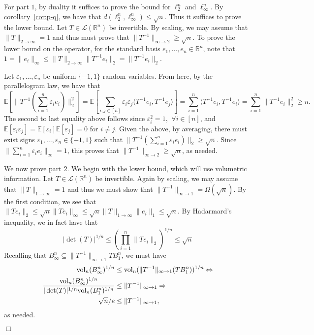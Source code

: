\documentclass[11pt]{article}
\theoremstyle{plain}
\newenvironment{proof}{\noindent {\sc Proof:}}{$\Box$ \medskip}
\theoremstyle{plain}
\newcommand{\set}[1]{\{{#1}\}}
\newcommand{\R}{\ensuremath{\mathbb{R}}}
\newcommand{\E}{\ensuremath{\mathbb{E}}}
\newcommand{\pr}[2]{\langle{#1, #2}\rangle}
\newcommand{\eps}{\varepsilon}
\newcommand{\vol}{{\rm vol}}
\begin{document}
\begin{proof}
For part $1$, by duality it suffices to prove the bound for $\ell_2^n$ and
$\ell_\infty^n$. By corollary~\ref{cor:p-q}, we have that
$d(\ell_2^n,\ell_\infty^n) \leq \sqrt{n}$. Thus it suffices to prove the lower
bound. Let $T \in \mathcal{L}(\R^n)$ be invertible. By
scaling, we may assume that $\|T\|_{2 \rightarrow \infty} = 1$ and thus must
prove that $\|T^{-1}\|_{\infty \rightarrow 2} \geq \sqrt{n}$. To prove the lower
bound on the operator, for the standard basis $e_1,\dots,e_n \in \R^n$, note
that $1 = \|e_i\|_\infty \leq \|T\|_{2 \rightarrow \infty} \|T^{-1} e_i\|_2 =
\|T^{-1} e_i\|_2$.

Let $\eps_1,\dots,\eps_n$ be uniform $\set{-1,1}$ random variables. From here,
by the parallelogram law, we have that
\[
\E[\|T^{-1}(\sum_{i=1}^n \eps_i e_i)\|_2^2] = \E[\sum_{i,j \in [n]} \eps_i
\eps_j \pr{T^{-1} e_i}{T^{-1} e_j}] = \sum_{i=1}^n \pr{T^{-1} e_i}{T^{-1} e_i} =
\sum_{i=1}^n \|T^{-1} e_i\|_2^2 \geq n.
\]
The second to last equality above follows since $\eps_i^2 = 1$, $~\forall i \in
[n]$, and $\E[\eps_i \eps_j] = \E[\eps_i]\E[\eps_j] = 0$ for $i \neq j$. Given
the above, by averaging, there must exist signs $\eps_1,\dots,\eps_n \in
\set{-1,1}$ such that $\|T^{-1}(\sum_{i=1}^n \eps_i e_i)\|_2 \geq \sqrt{n}$.
Since $\|\sum_{i=1}^n \eps_i e_i\|_\infty = 1$, this proves that
$\|T^{-1}\|_{\infty \rightarrow 2} \geq \sqrt{n}$, as needed.

We now prove part $2$. We begin with the lower bound, which will use volumetric
information. Let $T \in \mathcal{L}(\R^n)$ be invertible.
Again by scaling, we may assume that $\|T\|_{1 \rightarrow \infty} = 1$ and thus
we must show that $\|T^{-1}\|_{\infty \rightarrow 1} = \Omega(\sqrt{n})$. By the
first condition, we see that $\|Te_i\|_2 \leq \sqrt{n} \|T e_i\|_\infty \leq
\sqrt{n} \|T\|_{1 \rightarrow \infty} \|e_i\|_1 \leq \sqrt{n}$. By Hadarmard's
inequality, we in fact have that 
\[
|\det(T)|^{1/n} \leq (\prod_{i=1}^n \|Te_i\|_2)^{1/n} \leq \sqrt{n}
\]
Recalling that $B_\infty^n \subseteq \|T^{-1}\|_{\infty \rightarrow 1} TB_1^n$,
we must have 
\begin{align*}
\vol_n(B_\infty^n)^{1/n} &\leq \vol_n(\|T^{-1}\|_{\infty \rightarrow 1} (TB_1^n))^{1/n}
\Leftrightarrow \\
\frac{\vol_n(B_\infty^n)^{1/n}}{|\det(T)|^{1/n}\vol_n(B_1^n)^{1/n}} &\leq
\|T^{-1}\|_{\infty \rightarrow 1} 
\Rightarrow \\
\sqrt{n}/e &\leq \|T^{-1}\|_{\infty \rightarrow 1},
\end{align*}
as needed.


\end{proof}
\end{document}
